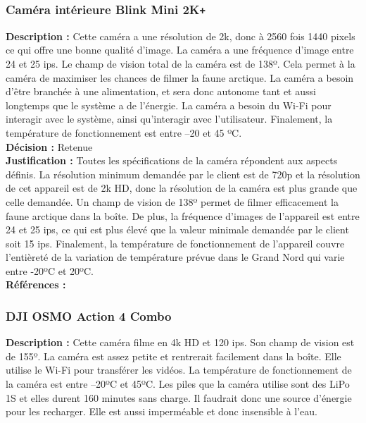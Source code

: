\subsubsection{Caméra intérieure Blink Mini 2K\texttt{+}}

\noindent
\textbf{Description :} Cette caméra a une résolution de 2k, donc à 2560 fois 1440 pixels
ce qui offre une bonne qualité d’image. La caméra a une fréquence d’image entre
24 et 25 ips. Le champ de vision total de la caméra est de 138º. Cela permet à
la caméra de maximiser les chances de filmer la faune arctique. La caméra a
besoin d’être branchée à une alimentation, et sera donc autonome tant et aussi
longtemps que le système a de l’énergie. La caméra a besoin du Wi-Fi pour
interagir avec le système, ainsi qu’interagir avec l’utilisateur. Finalement,
la température de fonctionnement est entre –20 et 45 ºC. \\

\noindent
\textbf{Décision :} Retenue \\

\noindent
\textbf{Justification :} Toutes les spécifications de la caméra répondent aux aspects
définis. La résolution minimum demandée par le client est de 720p et la
résolution de cet appareil est de 2k HD, donc la résolution de la caméra est
plus grande que celle demandée. Un champ de vision de 138º permet de filmer
efficacement la faune arctique dans la boîte. De plus, la fréquence d’images de
l’appareil est entre 24 et 25 ips, ce qui est plus élevé que la valeur minimale
demandée par le client soit 15 ips. Finalement, la température de
fonctionnement de l’appareil couvre l’entièreté de la variation de température
prévue dans le Grand Nord qui varie entre -20ºC et 20ºC. \\

\noindent
\textbf{Références :} \cite{1} \cite{2} \\

\subsubsection{DJI OSMO Action 4 Combo}

\noindent
\textbf{Description :} Cette caméra filme en 4k HD et 120 ips. Son champ de vision est
de 155º. La caméra est assez petite et rentrerait facilement dans la boîte.
Elle utilise le Wi-Fi pour transférer les vidéos. La température de
fonctionnement de la caméra est entre –20ºC et 45ºC. Les piles que la caméra
utilise sont des LiPo 1S et elles durent 160 minutes sans charge. Il faudrait
donc une source d’énergie pour les recharger. Elle est aussi imperméable et
donc insensible à l’eau. \\

